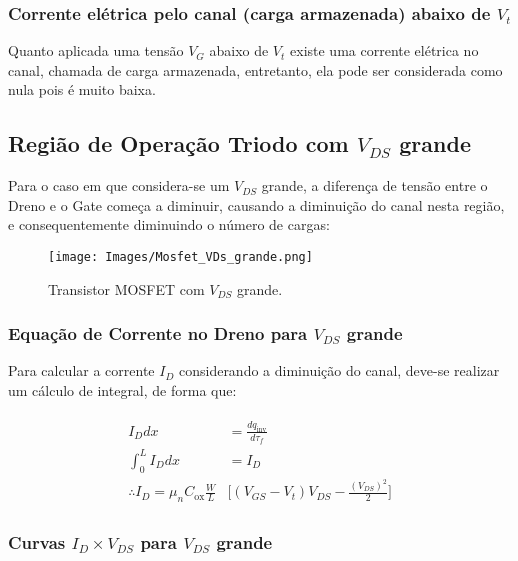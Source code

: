 \documentclass[12pt]{article}
\begin{document}
\subsubsection{Corrente elétrica pelo canal (carga armazenada) abaixo de $V_t$}

Quanto aplicada uma tensão $V_{G}$ abaixo de $V_t$ existe uma corrente elétrica no canal, chamada de carga armazenada, entretanto, ela pode ser considerada como nula pois é muito baixa.

\subsection{Região de Operação Triodo com $V_{DS}$ grande}

Para o caso em que considera-se um $V_{DS}$ grande, a diferença de tensão entre o Dreno e o Gate começa a diminuir, causando a diminuição do canal nesta região, e consequentemente diminuindo o número de cargas: 

\begin{figure}[H]
  \begin{center}
    \texttt{[image: Images/Mosfet\_VDs\_grande.png]}
  \end{center}
  \caption{Transistor MOSFET com $V_{DS}$ grande.}
\end{figure}

\subsubsection{Equação de Corrente no Dreno para $V_{DS}$ grande}

Para calcular a corrente $I_D$ considerando a diminuição do canal, deve-se realizar um cálculo de integral, de forma que:

\begin{align*}
  \begin{split}
    I_D dx &= \frac{dq_{\text{inv}}}{d \tau_f} \\[0.1cm]
    \int_0^L I_D dx &= I_D \\[0.5cm]
    \therefore I_D = \mu_n C_{\text{ox}} \frac{W}{L} & \Big[ (V_{GS}-V_t)V_{DS}-\frac{(V_{DS})^2}{2} \Big ]
  \end{split}
\end{align*}

\subsubsection{Curvas $I_D \times V_{DS}$ para $V_{DS}$ grande}
\end{document}
